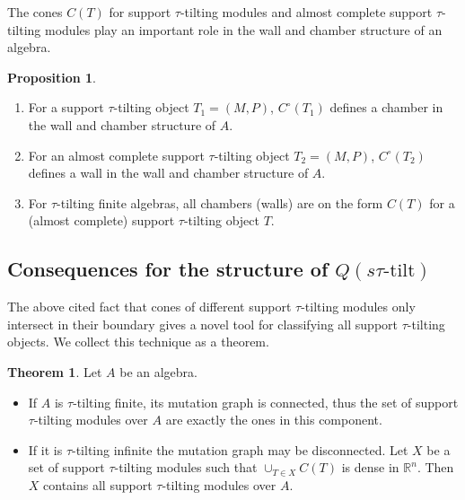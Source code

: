\documentclass[]{article}
\theoremstyle{definition}
\newtheorem{theorem}{Theorem}[section]
\newtheorem{proposition}{Proposition}[section]
\newcommand{\tu}{\ensuremath{\tau}}
\begin{document}
The cones $C(T)$ for support \tu-tilting modules and almost complete support \tu-tilting modules play an important role in the wall and chamber structure of an algebra.

\begin{proposition}\cite[Proposition 3.15, Corollary 3.16, Corollary 3.21]{Br_stle_2019}\label{tau-wall-chamber-result}
	\begin{enumerate}
		\item For a support \tu-tilting object $T_1 = (M,P)$, $C^\circ(T_1)$ defines a chamber in the wall and chamber structure of $A$.
		\item For an almost complete support \tu-tilting object $T_2 = (M,P)$, $C^\circ(T_2)$ defines a wall in the wall and chamber structure of $A$.
		\item For \tu-tilting finite algebras, all chambers (walls) are on the form $C(T)$ for a (almost complete) support \tu-tilting object $T$.
		
	\end{enumerate}
\end{proposition}



\subsection{Consequences for the structure of $Q(s\tu\text{-tilt})$}

The above cited fact that cones of different support \tu-tilting modules only intersect in their boundary gives a novel tool for classifying all support \tu-tilting objects. We collect this technique as a theorem.

\begin{theorem}
	Let $A$ be an algebra.
	
	\begin{itemize}
		\item If $A$ is \tu-tilting finite, its mutation graph is connected, thus the set of support \tu-tilting modules over $A$ are exactly the ones in this component.
		\item If it is \tu-tilting infinite the mutation graph may be disconnected. Let $X$ be a set of support \tu-tilting modules such that $\cup_{T \in X} C(T)$ is dense in $\mathbb{R}^n$. Then $X$ contains all support \tu-tilting modules over $A$.
		
	\end{itemize}
\end{theorem}
\end{document}
